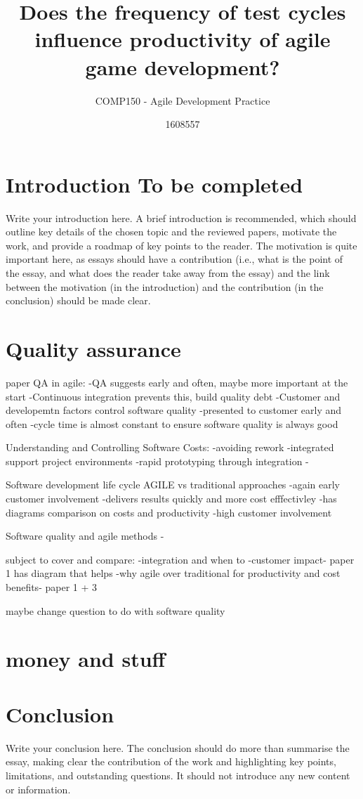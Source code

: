\documentclass{scrartcl}
\title{Does the frequency of test cycles influence productivity of agile game development? }
\subtitle{COMP150 - Agile Development Practice}
\author{1608557}
\begin{document}
\maketitle



\section{Introduction To be completed}

Write your introduction here. A brief introduction is recommended, which should outline key details of the chosen topic and the reviewed papers, motivate the work, and provide a roadmap of key points to the reader. The motivation is quite important here, as essays should have a contribution (i.e., what is the point of the essay, and what does the reader take away from the essay) and the link between the motivation (in the introduction) and the contribution (in the conclusion) should be made clear.

\section{Quality assurance}

paper QA in agile:
-QA suggests early and often, maybe more important at the start 
-Continuous integration prevents this, build quality debt
-Customer and developemtn factors control software quality
-presented to customer early and often
-cycle time is almost constant to ensure software quality is always good

Understanding and Controlling Software Costs:
-avoiding rework
-integrated support project environments 
-rapid prototyping through integration
-

Software development life cycle AGILE vs traditional approaches
-again early customer involvement 
-delivers results quickly and more cost efffectivley 
-has diagrams comparison on costs and productivity 
-high customer involvement 

Software quality and agile methods
-

 

subject to cover and compare:
-integration and when to 
-customer impact- paper 1 has diagram that helps
-why agile over traditional for productivity and cost benefits- paper 1 + 3

maybe change question to do with software quality


\section{money and stuff}






\section{Conclusion}

Write your conclusion here. The conclusion should do more than summarise the essay, making clear the contribution of the work and highlighting key points, limitations, and outstanding questions. It should not introduce any new content or information.



\end{document}
